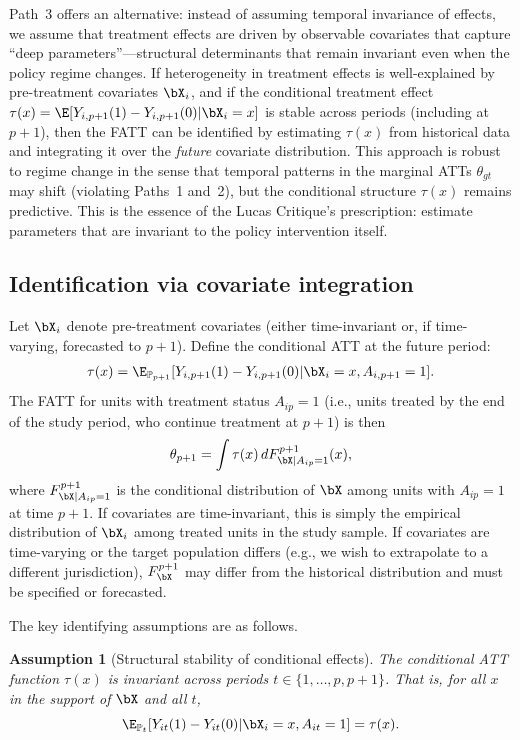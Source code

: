 \documentclass{article}
\newtheorem{assumption}{Assumption}
\renewcommand{\P}{\mathbb{P}}
\begin{document}
Path~3 offers an alternative: instead of assuming temporal invariance of effects, we assume that treatment effects are driven by observable covariates that capture ``deep parameters''---structural determinants that remain invariant even when the policy regime changes. If heterogeneity in treatment effects is well-explained by pre-treatment covariates $\bX_i$, and if the conditional treatment effect $\tau(x) = \E[Y_{i,p+1}(1) - Y_{i,p+1}(0) | \bX_i = x]$ is stable across periods (including at $p+1$), then the FATT can be identified by estimating $\tau(x)$ from historical data and integrating it over the \emph{future} covariate distribution. This approach is robust to regime change in the sense that temporal patterns in the marginal ATTs $\theta_{gt}$ may shift (violating Paths~1 and~2), but the conditional structure $\tau(x)$ remains predictive. This is the essence of the Lucas Critique's prescription: estimate parameters that are invariant to the policy intervention itself.

\subsection{Identification via covariate integration}

Let $\bX_i$ denote pre-treatment covariates (either time-invariant or, if time-varying, forecasted to $p+1$). Define the conditional ATT at the future period:
\begin{align*}
    \tau(x) = \E_{\P_{p+1}}[Y_{i,p+1}(1) - Y_{i,p+1}(0) | \bX_i = x, A_{i,p+1} = 1].
\end{align*}
The FATT for units with treatment status $A_{ip}=1$ (i.e., units treated by the end of the study period, who continue treatment at $p+1$) is then
\begin{align}
    \theta_{p+1} = \int \tau(x) \, dF_{\bX | A_{ip}=1}^{p+1}(x), \label{eq:fatt-cov-integral}
\end{align}
where $F_{\bX | A_{ip}=1}^{p+1}$ is the conditional distribution of $\bX$ among units with $A_{ip}=1$ at time $p+1$. If covariates are time-invariant, this is simply the empirical distribution of $\bX_i$ among treated units in the study sample. If covariates are time-varying or the target population differs (e.g., we wish to extrapolate to a different jurisdiction), $F_{\bX}^{p+1}$ may differ from the historical distribution and must be specified or forecasted.

The key identifying assumptions are as follows.

\begin{assumption}[Structural stability of conditional effects]\label{assump:struct-stab}
The conditional ATT function $\tau(x)$ is invariant across periods $t \in \{1,\ldots,p,p+1\}$. That is, for all $x$ in the support of $\bX$ and all $t$,
\[
\E_{\P_t}[Y_{it}(1) - Y_{it}(0) | \bX_i = x, A_{it} = 1] = \tau(x).
\]
\end{assumption}
\end{document}
